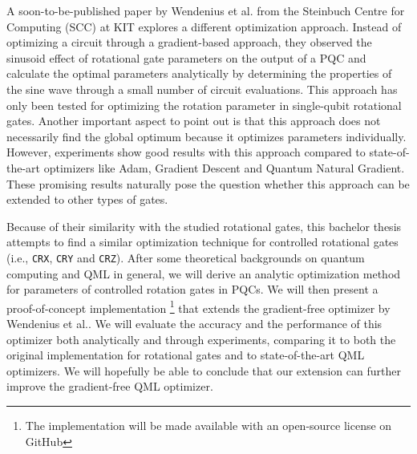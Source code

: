 A soon-to-be-published paper by Wendenius et al. from the Steinbuch Centre for
Computing (SCC) at KIT explores a different optimization approach.
Instead of optimizing a circuit through a gradient-based approach, they observed
the sinusoid effect of rotational gate parameters on the output of a PQC and
calculate the optimal parameters analytically by determining the properties of
the sine wave through a small number of circuit evaluations. 
This approach has only been tested for optimizing the rotation parameter in
single-qubit rotational gates.
Another important aspect to point out is that this approach does not necessarily
find the global optimum because it optimizes parameters individually.
However, experiments show good results with this approach compared to
state-of-the-art optimizers like Adam, Gradient Descent and Quantum Natural
Gradient.
These promising results naturally pose the question whether this approach can be
extended to other types of gates.

Because of their similarity with the studied rotational gates, this bachelor
thesis attempts to find a similar optimization technique for controlled
rotational gates (i.e., \texttt{CRX}, \texttt{CRY} and \texttt{CRZ}).
After some theoretical backgrounds on quantum computing and QML in general, we
will derive an analytic optimization method for parameters of controlled
rotation gates in PQCs.
We will then present a proof-of-concept implementation
\footnote{The implementation will be made available with an open-source license
on GitHub}
that extends the gradient-free optimizer by Wendenius et al..
We will evaluate the accuracy and the performance of this optimizer both
analytically and through experiments, comparing it to both the original
implementation for rotational gates and to state-of-the-art QML optimizers.
We will hopefully be able to conclude that our extension can further improve the
gradient-free QML optimizer.
